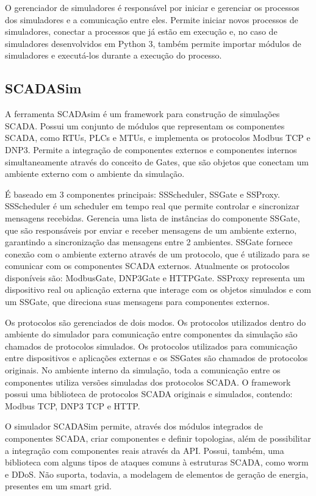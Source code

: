\documentclass[cic,tc]{iiufrgs}
\begin{document}
O gerenciador de simuladores é responsável por iniciar e gerenciar os processos dos simuladores e a comunicação entre eles. Permite iniciar novos processos de simuladores, conectar a processos que já estão em execução e, no caso de simuladores desenvolvidos em Python 3, também permite importar módulos de simuladores e executá-los durante a execução do processo.

\subsection{SCADASim}
A ferramenta SCADAsim \cite{scadasimart} é um framework para construção de simulações SCADA. Possui um conjunto de módulos que representam os componentes SCADA, como RTUs, PLCs e MTUs, e implementa os protocolos Modbus TCP e DNP3. Permite a integração de componentes externos e componentes internos simultaneamente através do conceito de Gates, que são objetos que conectam um ambiente externo com o ambiente da simulação.

É baseado em 3 componentes principais: SSScheduler, SSGate e SSProxy.  SSScheduler é um scheduler em tempo real que permite controlar e sincronizar mensagens recebidas. Gerencia uma lista de instâncias do componente SSGate, que são responsáveis por enviar e receber mensagens de um ambiente externo, garantindo a sincronização das mensagens entre 2 ambientes. SSGate fornece conexão com o ambiente externo através de um protocolo, que é utilizado para se comunicar com os componentes SCADA externos. Atualmente os protocolos disponíveis são: ModbusGate, DNP3Gate e HTTPGate. SSProxy representa um dispositivo real ou aplicação externa que interage com os objetos simulados e com um SSGate, que direciona suas mensagens para componentes externos.

Os protocolos são gerenciados de dois modos. Os protocolos utilizados dentro do ambiente do simulador para comunicação entre componentes da simulação são chamados de protocolos simulados. Os protocolos utilizados para comunicação entre dispositivos e aplicações externas e os SSGates são chamados de protocolos originais. No ambiente interno da simulação, toda a comunicação entre os componentes utiliza versões simuladas dos protocolos SCADA. O framework possui uma biblioteca de protocolos SCADA originais e simulados, contendo: Modbus TCP, DNP3 TCP e HTTP.

O simulador SCADASim permite, através dos módulos integrados de componentes SCADA, criar componentes e definir topologias, além de possibilitar a integração com componentes reais através da API. Possui, também, uma biblioteca com alguns tipos de ataques comuns à estruturas SCADA, como worm e DDoS. Não suporta, todavia, a modelagem de elementos de geração de energia, presentes em um smart grid.
\end{document}

